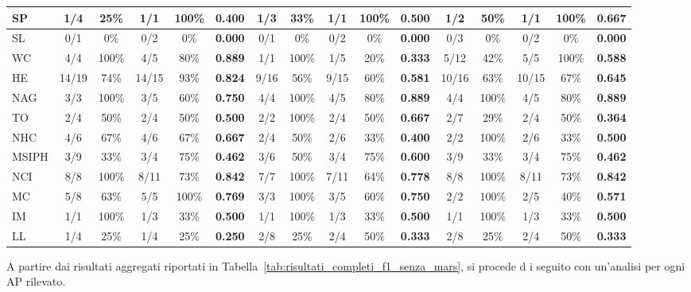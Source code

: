 \begin{table}[htbp]
{\begin{tabular}{|l||c|c|c|c|c||c|c|c|c|c||c|c|c|c|c|}
SP    & 1/4   & 25\%  & 1/1   & 100\% & \textbf{0.400} & 1/3   & 33\%  & 1/1  & 100\% & \textbf{0.500} & 1/2   & 50\%  & 1/1   & 100\% & \textbf{0.667} \\ \hline
SL    & 0/1   & 0\%   & 0/2   & 0\%   & \textbf{0.000} & 0/1   & 0\%   & 0/2  & 0\%   & \textbf{0.000} & 0/3   & 0\%   & 0/2   & 0\%   & \textbf{0.000} \\ \hline
WC    & 4/4   & 100\% & 4/5   & 80\%  & \textbf{0.889} & 1/1   & 100\% & 1/5  & 20\%  & \textbf{0.333} & 5/12  & 42\%  & 5/5   & 100\% & \textbf{0.588} \\ \hline
HE    & 14/19 & 74\%  & 14/15 & 93\%  & \textbf{0.824} & 9/16  & 56\%  & 9/15 & 60\%  & \textbf{0.581} & 10/16 & 63\%  & 10/15 & 67\%  & \textbf{0.645} \\ \hline
NAG   & 3/3   & 100\% & 3/5   & 60\%  & \textbf{0.750} & 4/4   & 100\% & 4/5  & 80\%  & \textbf{0.889} & 4/4   & 100\% & 4/5   & 80\%  & \textbf{0.889} \\ \hline
TO    & 2/4   & 50\%  & 2/4   & 50\%  & \textbf{0.500} & 2/2   & 100\% & 2/4  & 50\%  & \textbf{0.667} & 2/7   & 29\%  & 2/4   & 50\%  & \textbf{0.364} \\ \hline
NHC   & 4/6   & 67\%  & 4/6   & 67\%  & \textbf{0.667} & 2/4   & 50\%  & 2/6  & 33\%  & \textbf{0.400} & 2/2   & 100\% & 2/6   & 33\%  & \textbf{0.500} \\ \hline
MSIPH & 3/9   & 33\%  & 3/4   & 75\%  & \textbf{0.462} & 3/6   & 50\%  & 3/4  & 75\%  & \textbf{0.600} & 3/9   & 33\%  & 3/4   & 75\%  & \textbf{0.462} \\ \hline
NCI   & 8/8   & 100\% & 8/11  & 73\%  & \textbf{0.842} & 7/7   & 100\% & 7/11 & 64\%  & \textbf{0.778} & 8/8   & 100\% & 8/11  & 73\%  & \textbf{0.842} \\ \hline
MC    & 5/8   & 63\%  & 5/5   & 100\% & \textbf{0.769} & 3/3   & 100\% & 3/5  & 60\%  & \textbf{0.750} & 2/2   & 100\% & 2/5   & 40\%  & \textbf{0.571} \\ \hline
IM    & 1/1   & 100\% & 1/3   & 33\%  & \textbf{0.500} & 1/1   & 100\% & 1/3  & 33\%  & \textbf{0.500} & 1/1   & 100\% & 1/3   & 33\%  & \textbf{0.500} \\ \hline
LL    & 1/4   & 25\%  & 1/4   & 25\%  & \textbf{0.250} & 2/8   & 25\%  & 2/4  & 50\%  & \textbf{0.333} & 2/8   & 25\%  & 2/4   & 50\%  & \textbf{0.333} \\ \hline
\end{tabular}
}
\end{table}

A partire dai risultati aggregati riportati in Tabella~\ref{tab:risultati_completi_f1_senza_mars}, si procede d i seguito con un'analisi per ogni AP rilevato.

